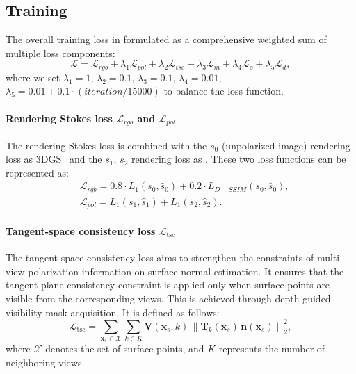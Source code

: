 \subsection{Training}
The overall training loss in \polgs formulated as a comprehensive weighted sum of multiple loss components:
\begin{equation}
	\mathcal{L} = \mathcal{L}_{rgb}+\lambda_{1}\mathcal{L}_{pol}+ \lambda_{2}\mathcal{L}_{tsc}+\lambda_{3}\mathcal{L}_{m}+\lambda_{4}\mathcal{L}_{o}	+\lambda_{5}\mathcal{L}_{d},
\end{equation}
where we set $\lambda_{1}=1$, $\lambda_{2}=0.1$, $\lambda_{3}=0.1$, $\lambda_{4}=0.01$, $\lambda_{5}=0.01+0.1\cdot (iteration/15000)$ to balance the loss function.
\vspace{-1em}

\paragraph{Rendering Stokes loss $\mathcal{L}_{rgb}$ and $\mathcal{L}_{pol}$\quad}
The rendering Stokes loss is combined with the $s_0$ (unpolarized image) rendering loss as 3DGS~\citep{kerbl20233d} and the 
$s_1$, $s_2$ rendering loss as \pandora. These two loss functions can be represented as:
\begin{align}
        &\mathcal{L}_{rgb} = 0.8\cdot L_{1} (s_0,\hat{s}_0)+0.2\cdot L_{D-SSIM}(s_0,\hat{s}_0),\\
        &\mathcal{L}_{pol} =L_{1} (s_1,\hat{s}_1)+L_{1} (s_2,\hat{s}_2).
\end{align}

\paragraph{Tangent-space consistency loss $\mathcal{L}_{\text{tsc}}$\quad}
The tangent-space consistency loss aims to strengthen the constraints of multi-view polarization information on surface normal estimation.
It ensures that the tangent plane consistency constraint is applied only when surface points are visible from the corresponding views. This is achieved through depth-guided visibility mask acquisition.
It is defined as follows:
\begin{equation}
\mathcal{L}_{\text{tsc}}
=
\sum_{\mathbf{x}_{s} \in \mathcal{X}}
\sum_{k \in K}
\mathbf{V}(\mathbf{x}_{s}, k)
\,
\left\|
\mathbf{T}_k(\mathbf{x}_{s})\,\mathbf{n}(\mathbf{x}_{s})
\right\|_2^2,
\end{equation}
where $\mathcal{X}$ denotes the set of surface points, and $K$ represents the number of neighboring views.

